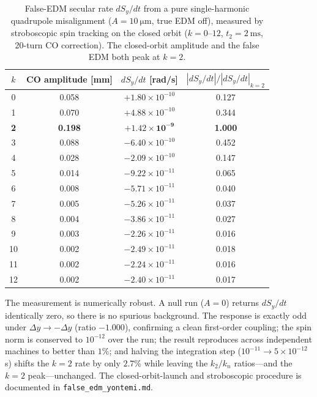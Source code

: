 \documentclass[preprint,12pt]{elsarticle}
\begin{document}
\begin{table}[t]
\centering
\caption{False-EDM secular rate $dS_y/dt$ from a pure single-harmonic
quadrupole misalignment ($A=\SI{10}{\micro\meter}$, true EDM off), measured
by stroboscopic spin tracking on the closed orbit ($k=0$--$12$,
$t_2=\SI{2}{\milli\second}$, 20-turn CO correction). The closed-orbit
amplitude and the false EDM both peak at $k=2$.}
\label{tab:falseedm}
\begin{tabular}{cccc}
\toprule
$k$ & CO amplitude [mm] & $dS_y/dt$ [rad/s] & $|dS_y/dt|/|dS_y/dt|_{k=2}$ \\
\midrule
0  & 0.058 & $+1.80\times10^{-10}$ & 0.127 \\
1  & 0.070 & $+4.88\times10^{-10}$ & 0.344 \\
\textbf{2}  & \textbf{0.198} & $\mathbf{+1.42\times10^{-9}}$  & \textbf{1.000} \\
3  & 0.088 & $-6.40\times10^{-10}$ & 0.452 \\
4  & 0.028 & $-2.09\times10^{-10}$ & 0.147 \\
5  & 0.014 & $-9.22\times10^{-11}$ & 0.065 \\
6  & 0.008 & $-5.71\times10^{-11}$ & 0.040 \\
7  & 0.005 & $-5.26\times10^{-11}$ & 0.037 \\
8  & 0.004 & $-3.86\times10^{-11}$ & 0.027 \\
9  & 0.003 & $-2.26\times10^{-11}$ & 0.016 \\
10 & 0.002 & $-2.49\times10^{-11}$ & 0.018 \\
11 & 0.002 & $-2.24\times10^{-11}$ & 0.016 \\
12 & 0.002 & $-2.40\times10^{-11}$ & 0.017 \\
\bottomrule
\end{tabular}
\end{table}

The measurement is numerically robust. A null run ($A=0$) returns $dS_y/dt$
identically zero, so there is no spurious background. The response is exactly
odd under $\Delta y\to-\Delta y$ (ratio $-1.000$), confirming a clean
first-order coupling; the spin norm is conserved to $10^{-12}$ over the run;
the result reproduces across independent machines to better than $1\%$; and
halving the integration step ($10^{-11}\!\to\!5\times10^{-12}$\,s) shifts the
$k=2$ rate by only $2.7\%$ while leaving the $k_2/k_n$ ratios---and the
$k=2$ peak---unchanged. The closed-orbit-launch and stroboscopic procedure
is documented in \texttt{false\_edm\_yontemi.md}.
\end{document}

